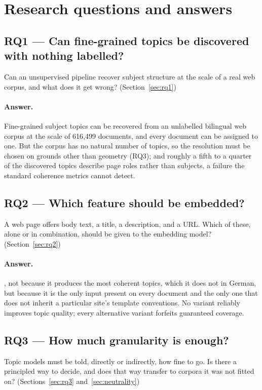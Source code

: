 \section*{Research questions and answers}
\label{sec:working-research-questions}

\subsection*{RQ1 --- Can fine-grained topics be discovered with nothing labelled?}
Can an unsupervised pipeline recover subject structure at the scale of a real web corpus,
and what does it get wrong? (Section~\ref{sec:rq1})

\paragraph{Answer.}
 Fine-grained subject topics can be recovered from an
unlabelled bilingual web corpus at the scale of 616{,}499 documents, and every document can be
assigned to one. But the corpus has no natural number of topics, so the resolution must be
chosen on grounds other than geometry (RQ3); and roughly a fifth to a quarter of the
discovered topics describe page roles rather than subjects, a failure the standard coherence
metrics cannot detect.

\subsection*{RQ2 --- Which feature should be embedded?}
A web page offers body text, a title, a description, and a URL. Which of these, alone or in
combination, should be given to the embedding model? (Section~\ref{sec:rq2})

\paragraph{Answer.}
, not because it produces the most coherent topics, which it does not in
German, but because it is the only input present on every document and the only one that does
not inherit a particular site's template conventions. \measured{} No variant reliably improves
topic quality; \proved{} every alternative variant forfeits guaranteed coverage.

\subsection*{RQ3 --- How much granularity is enough?}
Topic models must be told, directly or indirectly, how fine to go. Is there a principled way
to decide, and does that way transfer to corpora it was not fitted on? (Sections~\ref{sec:rq3}
and~\ref{sec:neutrality})

